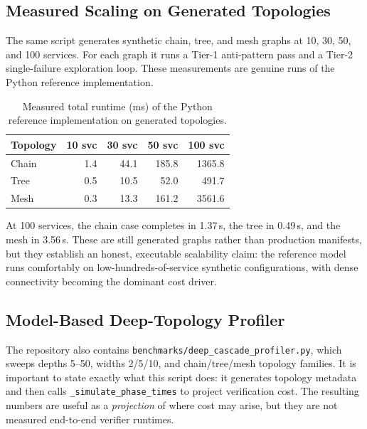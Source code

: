 \documentclass[10pt,twocolumn]{article}
\begin{document}
\subsection{Measured Scaling on Generated Topologies}

The same script generates synthetic chain, tree, and mesh graphs at 10, 30, 50,
and 100 services.  For each graph it runs a Tier-1 anti-pattern pass and a
Tier-2 single-failure exploration loop.  These measurements are genuine runs of
the Python reference implementation.

\begin{table}[t]
\centering
\caption{Measured total runtime (ms) of the Python reference implementation on generated topologies.}
\label{tab:measured_scaling}
\small
\begin{tabular}{@{}lrrrr@{}}
\toprule
\textbf{Topology} & \textbf{10 svc} & \textbf{30 svc} & \textbf{50 svc} & \textbf{100 svc} \\
\midrule
Chain & 1.4 & 44.1 & 185.8 & 1365.8 \\
Tree  & 0.5 & 10.5 & 52.0 & 491.7 \\
Mesh  & 0.3 & 13.3 & 161.2 & 3561.6 \\
\bottomrule
\end{tabular}
\end{table}

At 100 services, the chain case completes in 1.37\,s, the tree in 0.49\,s, and
the mesh in 3.56\,s.  These are still generated graphs rather than production
manifests, but they establish an honest, executable scalability claim: the
reference model runs comfortably on low-hundreds-of-service synthetic
configurations, with dense connectivity becoming the dominant cost driver.

\subsection{Model-Based Deep-Topology Profiler}
\label{sec:deep-cascade}

The repository also contains \texttt{benchmarks/deep\_cascade\_profiler.py},
which sweeps depths 5--50, widths 2/5/10, and chain/tree/mesh topology
families.  It is important to state exactly what this script does: it generates
topology metadata and then calls \texttt{\_simulate\_phase\_times} to project
verification cost.  The resulting numbers are useful as a \emph{projection} of
where cost may arise, but they are not measured end-to-end verifier runtimes.
\end{document}
